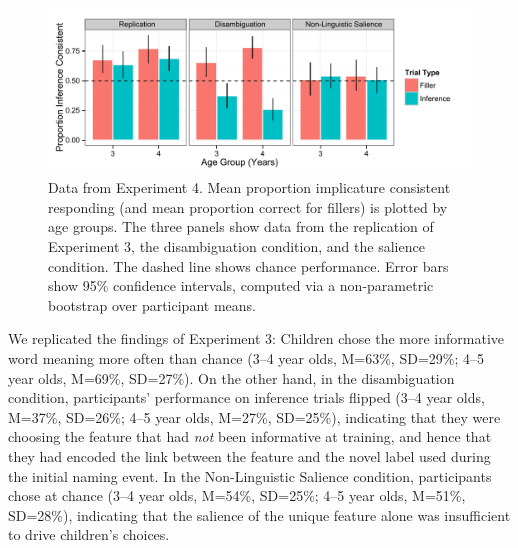 \documentclass[man,noapacite]{apa2}
\begin{document}
\begin{figure}[tr]
\begin{center}
\includegraphics[width=6.5in]{figures/e4_barplot.pdf}
\caption{\label{fig:kids} Data from Experiment 4. Mean proportion implicature consistent responding (and mean proportion correct for fillers) is plotted by age groups. The three panels show data from the replication of Experiment 3, the disambiguation condition, and the salience condition. The dashed line shows chance performance. Error bars show 95\% confidence intervals, computed via a non-parametric bootstrap over participant means.}
\end{center}
\end{figure}


We replicated the findings of Experiment 3: Children chose the more informative word meaning more often than chance (3--4 year olds, M=63\%, SD=29\%; 4--5 year olds, M=69\%, SD=27\%). On the other hand, in the disambiguation condition, participants' performance on inference trials flipped  (3--4 year olds, M=37\%, SD=26\%; 4--5 year olds, M=27\%, SD=25\%), indicating that they were choosing the feature that had \emph{not} been informative at training, and hence that they had encoded the link between the feature and the novel label used during the initial naming event. In the Non-Linguistic Salience condition, participants chose at chance  (3--4 year olds, M=54\%, SD=25\%; 4--5 year olds, M=51\%, SD=28\%), indicating that the salience of the unique feature alone was insufficient to drive children's choices. 
\end{document}
